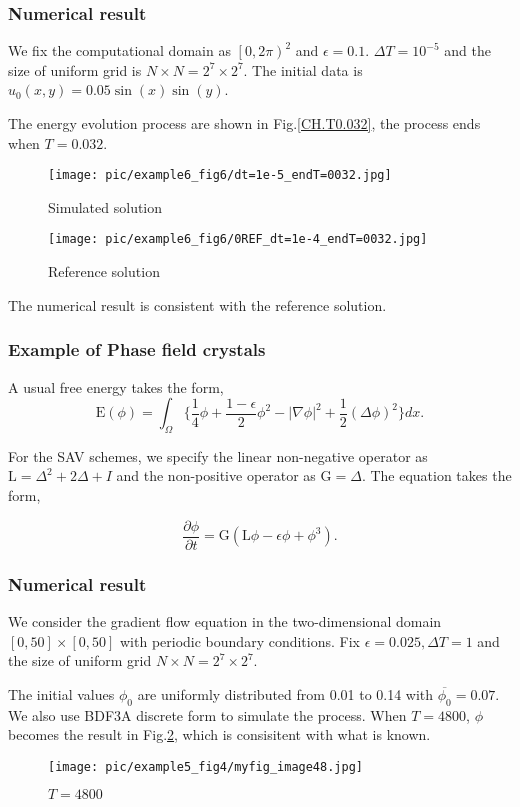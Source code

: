 \documentclass{beamer}
\begin{document}
\begin{frame}
\frametitle{Numerical result}
We fix the computational domain as $\left[0,2\pi\right)^2$ and $\epsilon = 0.1$. $\Delta T={10}^{-5}$ and the size of uniform grid is $N\times N=2^7 \times 2^7$. The initial data is $u_0(x,y)=0.05\sin(x)\sin(y)$.

The energy evolution process are shown in Fig.\ref{CH.T0.032}, the process ends when $T=0.032$.
\begin{figure}[h]
    \centering
    \begin{minipage}[t]{0.5\linewidth}
        \centering
        \texttt{[image: pic/example6\_fig6/dt=1e-5\_endT=0032.jpg]}
        \caption{Simulated solution}
        \label{CH.T0.032}
    \end{minipage}%
    \begin{minipage}[t]{0.5\linewidth}
        \centering
        \texttt{[image: pic/example6\_fig6/0REF\_dt=1e-4\_endT=0032.jpg]}
        \caption{Reference solution}
        \label{REF_CH.T0.032}
    \end{minipage}   
\end{figure}

The numerical result is consistent with the reference solution.
\end{frame}

\begin{frame}
\frametitle{Example of Phase field crystals}
A usual free energy takes the form,
$$
\mathrm{E}(\phi)=
\int_{\Omega}
\Big\{
\frac{1}{4}\phi
+\frac{1-\epsilon}{2}{\phi}^2
-{\left|\nabla\phi\right|}^2
+\frac{1}{2}{(\Delta\phi)}^2
\Big\}dx.
$$

For the SAV schemes, we specify the linear non-negative operator as $\mathrm{L}={\Delta}^2+2\Delta+I$ and the non-positive operator as 
$\mathrm{G}=\Delta$. The equation takes the form,

\begin{equation}\label{PFC}
\frac{\partial\phi}{\partial t}
=\mathrm{G}(\mathrm{L}\phi
-\epsilon\phi
+{\phi}^3).
\end{equation}

\end{frame}

\begin{frame}
\frametitle{Numerical result}
We consider the gradient flow equation in the two-dimensional domain $\left[0,50\right]\times\left[0,50\right]$ with periodic boundary conditions. Fix $\epsilon = 0.025, \Delta T=1$ and the size of uniform grid $N\times N=2^7 \times 2^7$.
 
The initial values $\phi_0$ are uniformly distributed from 0.01 to 0.14 with $\overline{\phi_0}=0.07$. We also use BDF3A discrete form to simulate the process. When $T=4800$, $\phi$ becomes the result in Fig.\ref{PFC.T4800}, which is consisitent with what is known.

\begin{figure}[h]
  \centering
  \texttt{[image: pic/example5\_fig4/myfig\_image48.jpg]}
  \caption{$T=4800$}\label{PFC.T4800}
\end{figure}
\end{frame}
\end{document}
